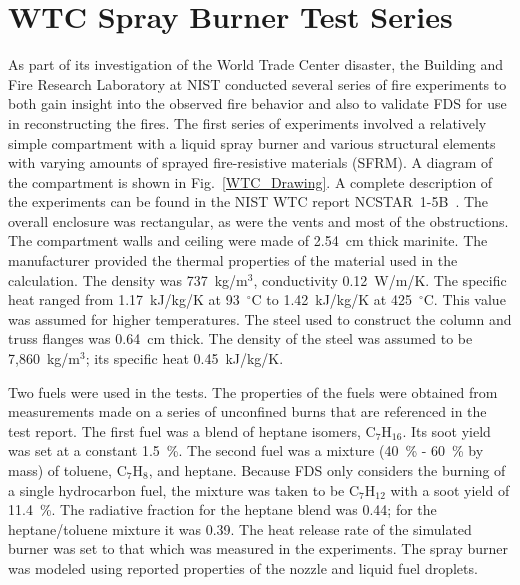 \clearpage





\section{WTC Spray Burner Test Series}

As part of its investigation of the World Trade Center disaster, the Building and Fire Research Laboratory at NIST conducted several series of fire experiments to both gain insight into the observed fire behavior and also to validate FDS for use in reconstructing the fires. The first series of experiments involved a relatively simple compartment with a liquid spray burner and various structural elements with varying amounts of sprayed fire-resistive materials (SFRM). A diagram of the compartment is shown in Fig.~\ref{WTC_Drawing}. A complete description of the experiments can be found in the NIST WTC report NCSTAR~1-5B~\cite{NIST_NCSTAR_1-5B}. The overall enclosure was rectangular, as were the vents and most of the obstructions. The compartment walls and ceiling were made of 2.54~cm thick marinite. The manufacturer provided the thermal properties of the material used in the calculation. The density was 737~kg/m$^3$, conductivity 0.12~W/m/K. The specific heat ranged from 1.17~kJ/kg/K at 93~$^\circ$C to 1.42~kJ/kg/K at 425~$^\circ$C. This value was assumed for higher temperatures. The steel used to construct the column and truss flanges was 0.64~cm thick.  The density of the steel was assumed to be 7,860~kg/m$^3$; its specific heat 0.45~kJ/kg/K.

Two fuels were used in the tests. The properties of the fuels were obtained from measurements made on a series of unconfined burns that are referenced in the test report. The first fuel was a blend of heptane isomers, C$_7$H$_{16}$. Its soot yield was set at a constant 1.5~\%. The second fuel was a mixture (40~\% - 60~\% by mass) of toluene, C$_7$H$_8$, and heptane. Because FDS only considers the burning of a single hydrocarbon fuel, the mixture was taken to be C$_7$H$_{12}$ with a soot yield of 11.4~\%. The radiative fraction for the heptane blend was 0.44; for the heptane/toluene mixture it was 0.39. The heat release rate of the simulated burner was set to that which was measured in the experiments. The spray burner was modeled using reported properties of the nozzle and liquid fuel droplets.

